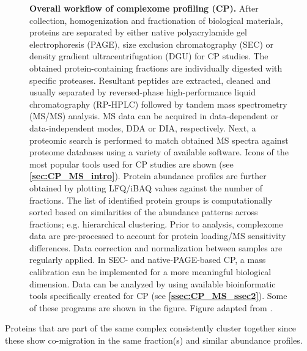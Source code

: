\begin{figure}[ht!]
    \caption{\textbf{Overall workflow of complexome profiling (CP).} After collection, homogenization and fractionation of biological materials, proteins are separated by either native polyacrylamide gel electrophoresis (PAGE), size exclusion chromatography (SEC) or density gradient ultracentrifugation (DGU) for CP studies. The obtained protein-containing fractions are individually digested with specific proteases. Resultant peptides are extracted, cleaned and usually separated by reversed-phase high-performance liquid chromatography (RP-HPLC) followed by tandem mass spectrometry (MS/MS) analysis. MS data can be acquired in data-dependent or data-independent modes, DDA or DIA, respectively. Next, a proteomic search is performed to match obtained MS spectra against proteome databases using a variety of available software. Icons of the most popular tools used for CP studies are shown (see \textbf{\autoref{sec:CP_MS_intro}}). Protein abundance profiles are further obtained by plotting LFQ/iBAQ values against the number of fractions. The list of identified protein groups is computationally sorted based on similarities of the abundance patterns across fractions; e.g. hierarchical clustering. Prior to analysis, complexome data are pre-processed to account for protein loading/MS sensitivity differences. Data correction and normalization between samples are regularly applied. In SEC- and native-PAGE-based CP, a mass calibration can be implemented for a more meaningful biological dimension. Data can be analyzed by using available bioinformatic tools specifically created for CP (see \textbf{\autoref{ssec:CP_MS_ssec2}}). Some of these programs are shown in the figure. Figure adapted from \cite{Cabrera-Orefice_2022}.}
\end{figure}

Proteins that are part of the same complex consistently cluster together since these show co-migration in the same fraction(s) and similar abundance profiles.     

